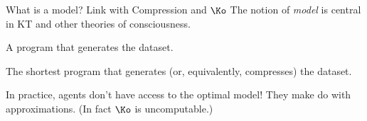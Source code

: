
\begin{frame}[label=ladila]{What is a model? Link with Compression and $\Ko$}
The notion of {\em model} is central in KT and other theories of consciousness. \vfill

 
 \begin{definition}
 A program that generates the dataset. 
 \end{definition} \vfill
 
\begin{definition}
The shortest program that generates (or, equivalently, compresses) the dataset.
\end{definition}\vfill
In practice, agents don't have access to the optimal model! They make do with approximations. (In fact $\Ko$ is uncomputable.)
\end{frame}



  
